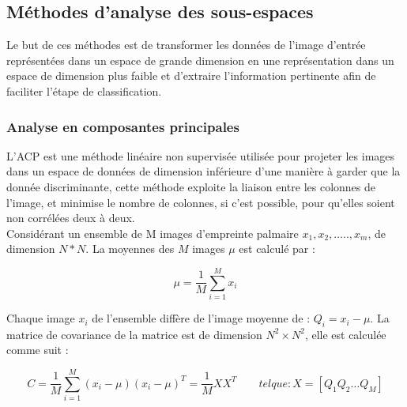 \subsection{Méthodes d'analyse des sous-espaces }
Le but de ces méthodes  est de transformer les données de l'image d'entrée représentées dans un espace de grande dimension en une représentation dans un espace de dimension plus faible et d'extraire l'information pertinente afin de faciliter l'étape de classification. 

\subsubsection{Analyse en composantes principales}
L’ACP est une méthode linéaire  non supervisée  utilisée pour projeter les images dans un espace de données de dimension inférieure d’une manière à garder que la donnée discriminante, cette méthode exploite la liaison entre les colonnes de l’image, et minimise le nombre de colonnes, si c’est possible, pour qu’elles soient non corrélées deux à deux\citep{lu2003palmprint}. 
\\Considérant un ensemble de M images d'empreinte palmaire $ x_{1}, x_{2},…..,x_{m} $, de dimension $ N * N $.
La moyennes des $ M $ images $\mu $ est calculé par :
\begin{center}
	\begin{equation}\label{eq:chapitre3eq1}
	\mu = \frac{1}{M}\sum_{i=1}^{M}x_{i}
	\end{equation}
\end{center}
	Chaque image $ {x_{i}}$ de l'ensemble diffère de l'image moyenne de : $ Q_{i}=x_{i}-\mu$.
	La matrice de covariance de la matrice est de dimension $N^{2} \times N^{2}$, elle est calculée comme suit :
	\begin{center}
		\begin{equation}\label{eq:chapitre3eq2}
C = \frac{1}{M}\sum_{i=1}^{M}(x_{i}-\mu)(x_{i}-\mu)^{T}=\frac{1}{M}XX^{T} \qquad tel que : \! X= [Q_{1} Q_{2}… Q_{M}]
		\end{equation}
	\end{center}

